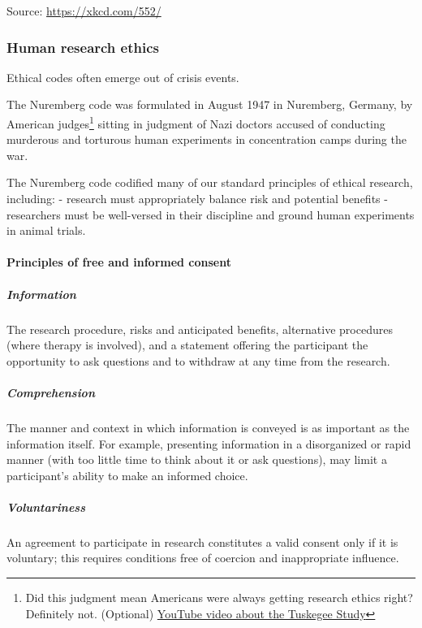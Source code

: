 \documentclass[
  openany]{book}
\begin{document}
Source: \url{https://xkcd.com/552/}

\hypertarget{human-research-ethics}{%
\subsubsection{Human research ethics}\label{human-research-ethics}}

Ethical codes often emerge out of crisis events.

The Nuremberg code was formulated in August 1947 in Nuremberg, Germany, by American judges\footnote{Did this judgment mean Americans were always getting research ethics right? Definitely not. (Optional) \href{https://www.youtube.com/watch?v=afwK2CVpc9E}{YouTube video about the Tuskegee Study}} sitting in judgment of Nazi doctors accused of conducting murderous and torturous human experiments in concentration camps during the war.

The Nuremberg code codified many of our standard principles of ethical research, including:
- research must appropriately balance risk and potential benefits
- researchers must be well-versed in their discipline and ground human experiments in animal trials.

\hypertarget{principles-of-free-and-informed-consent}{%
\paragraph{Principles of free and informed consent}\label{principles-of-free-and-informed-consent}}

\hypertarget{information}{%
\subparagraph{Information}\label{information}}

The research procedure, risks and anticipated benefits, alternative procedures (where therapy is involved), and a statement offering the participant the opportunity to ask questions and to withdraw at any time from the research.

\hypertarget{comprehension}{%
\subparagraph{Comprehension}\label{comprehension}}

The manner and context in which information is conveyed is as important as the information itself. For example, presenting information in a disorganized or rapid manner (with too little time to think about it or ask questions), may limit a participant's ability to make an informed choice.

\hypertarget{voluntariness}{%
\subparagraph{Voluntariness}\label{voluntariness}}

An agreement to participate in research constitutes a valid consent only if it is voluntary; this requires conditions free of coercion and inappropriate influence.
\end{document}
